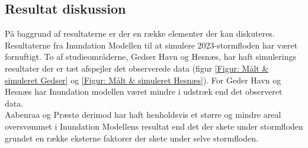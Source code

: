 


\subsection{Resultat diskussion}
På baggrund af resultaterne er der en række elementer der kan diskuteres. Resultaterne fra Inundation Modellen til at simulere 2023-stormfloden har været fornuftigt. To af studieområderne, Gedser Havn og Hesnæs, har haft simulerings resultater der er tæt afspejler det observerede data (figur \ref{Figur: Målt & simuleret Gedser} og \ref{Figur: Målt & simuleret Hesnæs}). For Geder Havn og Hesnæs har Inundation modellen været mindre i udstræk end det observeret data. \\
Aabenraa og Præstø derimod har haft henholdsvis et større og mindre areal oversvømmet i Inundation Modellens resultat end det der skete under stormfloden grundet en række eksterne faktorer der skete under selve stormfloden.\\

